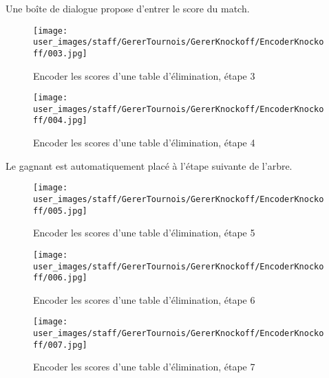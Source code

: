 Une boîte de dialogue propose d'entrer le score du match.

\begin{figure}[H]
\centering
\texttt{[image: user\_images/staff/GererTournois/GererKnockoff/EncoderKnockoff/003.jpg]}
\caption{Encoder les scores d'une table d'élimination, étape 3}
\end{figure}

\begin{figure}[H]
\centering
\texttt{[image: user\_images/staff/GererTournois/GererKnockoff/EncoderKnockoff/004.jpg]}
\caption{Encoder les scores d'une table d'élimination, étape 4}
\end{figure}

Le gagnant est automatiquement placé à l'étape suivante de l'arbre.

\begin{figure}[H]
\centering
\texttt{[image: user\_images/staff/GererTournois/GererKnockoff/EncoderKnockoff/005.jpg]}
\caption{Encoder les scores d'une table d'élimination, étape 5}
\end{figure}

\begin{figure}[H]
\centering
\texttt{[image: user\_images/staff/GererTournois/GererKnockoff/EncoderKnockoff/006.jpg]}
\caption{Encoder les scores d'une table d'élimination, étape 6}
\end{figure}

\begin{figure}[H]
\centering
\texttt{[image: user\_images/staff/GererTournois/GererKnockoff/EncoderKnockoff/007.jpg]}
\caption{Encoder les scores d'une table d'élimination, étape 7}
\end{figure}
